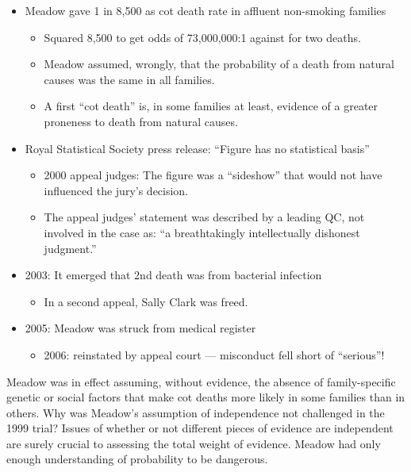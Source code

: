 \documentclass[
  10pt,
  b5paper]{book}
\providecommand{\tightlist}{%
  \setlength{\itemsep}{0pt}\setlength{\parskip}{0pt}}
\begin{document}
\begin{itemize}
\tightlist
\item
  Meadow gave 1 in 8,500 as cot death rate in affluent non-smoking families

  \begin{itemize}
  \tightlist
  \item
    Squared 8,500 to get odds of 73,000,000:1 against for two deaths.
  \item
    Meadow assumed, wrongly, that the probability of a death from
    natural causes was the same in all families.
  \item
    A first ``cot death'' is, in some families at least, evidence of a greater
    proneness to death from natural causes.
  \end{itemize}
\item
  Royal Statistical Society press release: ``Figure has no statistical basis''

  \begin{itemize}
  \tightlist
  \item
    2000 appeal judges: The figure was a
    ``sideshow'' that would not have influenced the jury's decision.
  \item
    The appeal judges' statement was described by a leading QC, not
    involved in the case as: ``a breathtakingly intellectually dishonest
    judgment.''
  \end{itemize}
\item
  2003: It emerged that 2nd death was from bacterial infection

  \begin{itemize}
  \tightlist
  \item
    In a second appeal, Sally Clark was freed.
  \end{itemize}
\item
  2005: Meadow was struck from medical register

  \begin{itemize}
  \tightlist
  \item
    2006: reinstated by appeal court --- misconduct fell short
    of ``serious''!
  \end{itemize}
\end{itemize}

Meadow was in effect assuming, without evidence, the
absence of family-specific genetic or social factors that
make cot deaths more likely in some families than in others.
Why was Meadow's assumption of independence not challenged
in the 1999 trial? Issues of whether or not different pieces
of evidence are independent are surely crucial to assessing
the total weight of evidence. Meadow had only enough
understanding of probability to be dangerous.
\end{document}
